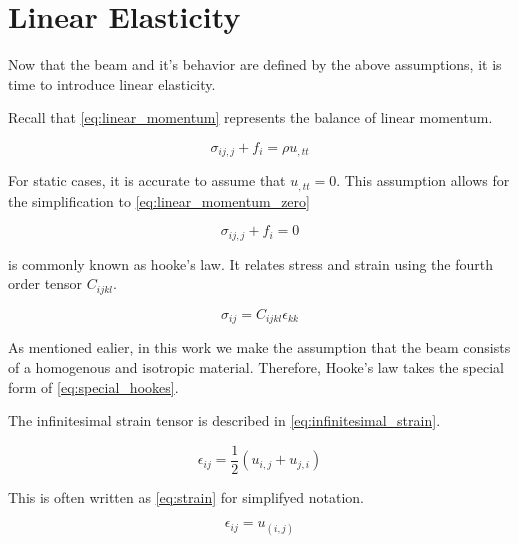 \section{Linear Elasticity}
\label{sec:continuum_mechanics}

Now that the beam and it's behavior are defined by the above assumptions, it is time to introduce linear elasticity.

Recall that \cref{eq:linear_momentum} represents the balance of linear momentum. 

\begin{equation}
\sigma_{ij,j} 
+
f_i 
= 
\rho 
u_{,tt}
\label{eq:linear_momentum}
\end{equation}

For static cases, it is accurate to assume that $u_{,tt} = 0$.
This assumption allows for the simplification to \cref{eq:linear_momentum_zero}

\begin{equation}
\sigma_{ij,j}+f_i = 0
\label{eq:linear_momentum_zero}
\end{equation}

 is commonly known as hooke's law.
It relates stress and strain using the fourth order tensor $C_{ijkl}$.

\begin{equation}
\sigma_{ij} = C_{ijkl}\epsilon_{kk}
\label{eq:hookes_law}
\end{equation}

As mentioned ealier, in this work we make the assumption that the beam consists of a homogenous and isotropic material.
Therefore, Hooke's law takes the special form of \cref{eq:special_hookes}.

The infinitesimal strain tensor is described in \cref{eq:infinitesimal_strain}.

\begin{equation}
\epsilon_{ij}=\frac{1}{2}(u_{i,j}+u_{j,i})
\label{eq:infinitesimal_strain}
\end{equation}

This is often written as \cref{eq:strain} for simplifyed notation.

\begin{equation}
\epsilon_{ij}=u_{(i,j)}
\label{eq:strain}
\end{equation}

